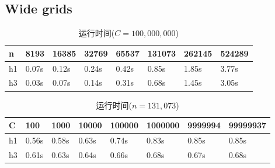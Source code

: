 \subsection{Wide grids}
\begin{table}[H]
  \caption{运行时间($C=100,000,000$)}
  \centering
  \begin{tabular}{p{1.5cm}<{\centering}p{1.5cm}<{\centering}p{1.5cm}<{\centering}p{1.5cm}<{\centering}p{1.5cm}<{\centering}p{1.5cm}<{\centering}p{1.5cm}<{\centering}p{1.5cm}<{\centering}}
  \toprule
   n & 8193 & 16385 & 32769 & 65537 & 131073 &262145 &524289\\
  \midrule
   h1  & 0.07s & 0.12s & 0.24s & 0.42s & 0.85s & 1.85s & 3.77s \\
   h3  & 0.03s & 0.07s & 0.14s & 0.31s & 0.68s & 1.45s & 3.05s \\
  \bottomrule
  \end{tabular} 
\end{table}
\begin{table}[H]
  \caption{运行时间($n=131,073$)}
  \label{tab25}
  \centering
  \begin{tabular}{p{1.3cm}<{\centering}p{1.5cm}<{\centering}p{1.5cm}<{\centering}p{1.5cm}<{\centering}p{1.5cm}<{\centering}p{1.5cm}<{\centering}p{1.5cm}<{\centering}p{1.7cm}<{\centering}}
  \toprule
   C & 100 & 1000 & 10000 & 100000 & 1000000 &9999994 & 99999937\\
  \midrule
   h1  & 0.56s & 0.58s & 0.63s & 0.74s & 0.83s & 0.85s & 0.85s \\
   h3  & 0.61s & 0.63s & 0.64s & 0.66s & 0.68s & 0.67s & 0.68s \\
  \bottomrule
  \end{tabular} 
\end{table}
